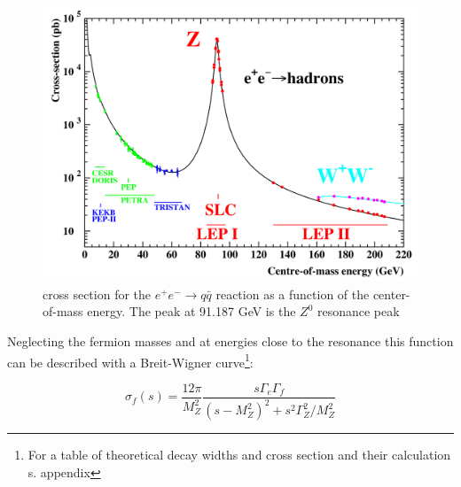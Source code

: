 \begin{figure}[H]
\centering
\includegraphics[width=\linewidth]{graphics/crosssection}
\caption[cross section as a function of CMS]{cross section for the $e^+ e^- \rightarrow q \bar{q}$ reaction as a function of the center-of-mass energy. The peak at 91.187 GeV is the $Z^0$ resonance peak \cite{jakobs}}
\label{fig:principles:crosssection}
\end{figure}

 Neglecting the fermion masses and at energies close to the resonance this function can be described with a Breit-Wigner curve\footnote{For a table of theoretical decay widths and cross section and their calculation s. appendix}\cite{muenchen}:
 
\begin{equation}
\sigma_f(s) = \frac{12\pi}{M_Z^2} \frac{s\Gamma_e\Gamma_f}{(s-M_Z^2)^2+s^2\Gamma_Z^2/M_Z^2}
\label{eq:principles:breitwigner}
\end{equation}

